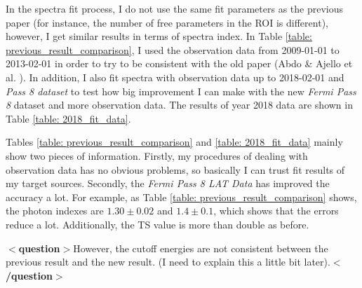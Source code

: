 \documentclass[12pt]{report}
\newcommand{\question}[1]{
  $<$\textbf{question}$>$#1$<$\textbf{/question}$>$
}
\begin{document}
      In the spectra fit process, I do not use the same fit parameters as the previous 
      paper (for instance, the number of free parameters in the ROI is different), 
      however, I get similar results in terms of spectra index.  
      In Table \ref{table: previous_result_comparison}, I used the observation data from 
      2009-01-01 to 2013-02-01 in order to try to be consistent with the old paper 
      (Abdo \& Ajello et al. \cite{0067-0049-208-2-17}). In addition, I also fit spectra with 
      observation data up to 2018-02-01 and \textit{Pass 8 dataset} to test how big improvement 
      I can make with the new \textit{Fermi Pass 8} dataset and more observation data. 
      The results of year 2018 data are shown in Table \ref{table: 2018_fit_data}.

      Tables \ref{table: previous_result_comparison} and \ref{table: 2018_fit_data} mainly 
      show two pieces of information. Firstly, my procedures of dealing with observation 
      data has no obvious problems, so basically I can trust fit results of my target 
      sources. Secondly, the \textit{Fermi Pass 8 LAT Data} has improved the accuracy a 
      lot. For example, as Table \ref{table: previous_result_comparison} shows, the photon 
      indexes are $1.30\pm0.02$ and $1.4\pm0.1$, which shows that the errors reduce a lot. 
      Additionally, the TS value is more than double as before.
      \question{However, the cutoff energies are not consistent between the previous result and the new result.
        (I need to explain this a little bit later).}
      \vspace{1cm} 
\end{document}
